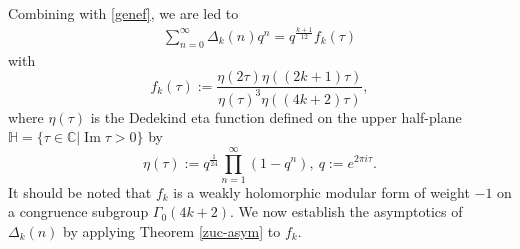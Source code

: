 \documentclass[12pt]{article}
\numberwithin{equation}{section}
\begin{document}
Combining with \eqref{genef}, we are led to
\begin{align}\label{dia-eta}
\sum_{n=0}^{\infty} \Delta_{k}(n) q^{n} =q^{\frac{k+1}{12}} f_{k}(\tau)
\end{align}
with
\begin{equation*}
f_{k}(\tau):=\frac{\eta\left(2\tau\right)\eta\left((2 k+1)\tau \right)}{\eta\left(\tau\right)^{3}\eta\left((4 k+2)\tau\right)},
\end{equation*}
where $\eta(\tau)$ is the Dedekind eta function defined on the upper half-plane $\mathbb{H}=\{\tau \in \mathbb{C} | \operatorname{Im} \tau>0\}$ by
\begin{equation}\label{eta-def}
\eta(\tau):=q^{\frac{1}{24}}\prod_{n=1}^\infty(1-q^n),~q:=e^{2\pi i\tau}.
\end{equation}
It should be noted that $f_{k}$ is a weakly holomorphic modular form of weight $-1$ on a congruence subgroup $\Gamma_0(4 k+2)$.
We now establish the asymptotics of $\Delta_{k}(n)$ by applying Theorem \ref{zuc-asym} to $f_{k}$.
\end{document}
